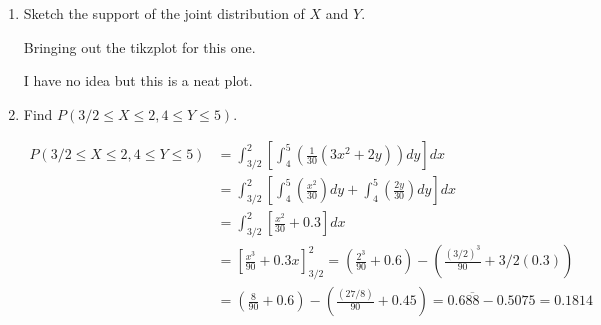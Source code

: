     \begin{enumerate}[label=(\alph*)]
        \item Sketch the support of the joint distribution of $X$ and $Y$.
        
        \begin{mdframed}
            Bringing out the tikzplot for this one.


            I have no idea but this is a neat plot.
        \end{mdframed}

        \item Find $P(3/2 \leq X \leq 2, 4 \leq Y \leq 5)$.
        
        \begin{mdframed}
            \begin{align*}
                P(3/2 \leq X \leq 2, 4 \leq Y \leq 5)   & = \int_{3/2}^{2}\left[\int_{4}^{5}\left(\frac{1}{30}(3x^{2} + 2y)\right)dy\right]dx   \\
                & = \int_{3/2}^{2}\left[\int_{4}^{5}\left(\frac{x^{2}}{30}\right)dy + \int_{4}^{5}\left(\frac{2y}{30}\right)dy\right]dx                    \\
                & = \int_{3/2}^{2}\left[\frac{x^{2}}{30} + 0.3\right]dx                                                                           \\
                & = \left[\frac{x^{3}}{90} + 0.3x \right]_{3/2}^{2} = \left(\frac{2^{3}}{90} + 0.6\right) - \left(\frac{(3/2)^{3}}{90} + 3/2(0.3)\right)      \\
                & = \left(\frac{8}{90} + 0.6\right) - \left(\frac{(27/8)}{90} + 0.45\right) = 0.6\overline{88} - 0.5075 = \boxed{0.1814}
            \end{align*}
        \end{mdframed}

        \pagebreak


\end{enumerate}
